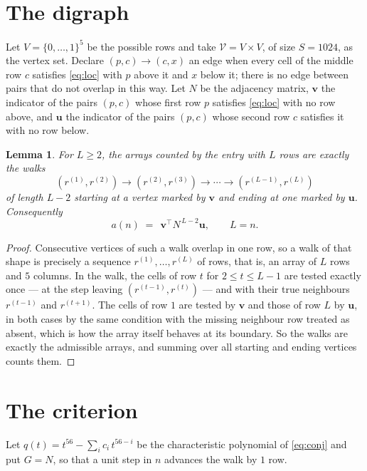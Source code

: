 \documentclass[11pt,a4paper]{article}
\theoremstyle{plain}
\newtheorem{lemma}[theorem]{Lemma}
\theoremstyle{definition}
\begin{document}
\section{The digraph}

Let $V=\{0,\dots,1\}^{5}$ be the possible rows and take
$\mathcal V=V\times V$, of size $S=1024$, as the vertex set. Declare $(p,c)\to(c,x)$ an edge
when every cell of the middle row $c$ satisfies \eqref{eq:loc} with $p$ above it and $x$
below it; there is no edge between pairs that do not overlap in this way. Let $N$ be the
adjacency matrix, $\mathbf{v}$ the indicator of the pairs $(p,c)$ whose first row $p$
satisfies \eqref{eq:loc} with no row above, and $\mathbf{u}$ the indicator of
the pairs $(p,c)$ whose second row $c$ satisfies it with no row below.

\begin{lemma}\label{lem:walk}
For $L\ge2$, the arrays counted by the entry with $L$ rows are exactly the walks
\[
(r^{(1)},r^{(2)})\to(r^{(2)},r^{(3)})\to\cdots\to(r^{(L-1)},r^{(L)})
\]
of length $L-2$ starting at a vertex marked by $\mathbf{v}$ and ending at one marked by
$\mathbf{u}$. Consequently
\[
a(n)\;=\;\,\mathbf{v}^{\!\top}N^{\,L-2}\mathbf{u},\qquad L=n .
\]
\end{lemma}

\begin{proof}
Consecutive vertices of such a walk overlap in one row, so a walk of that shape is
precisely a sequence $r^{(1)},\dots,r^{(L)}$ of rows, that is, an array of $L$ rows
and $5$ columns. In the walk, the cells of row $t$ for $2\le t\le L-1$ are tested
exactly once --- at the step leaving $(r^{(t-1)},r^{(t)})$ --- and with their true
neighbours $r^{(t-1)}$ and $r^{(t+1)}$. The cells of row $1$ are tested by
$\mathbf{v}$ and those of row $L$ by $\mathbf{u}$, in both cases by the same condition
with the missing neighbour row treated as absent, which is how the array itself behaves at
its boundary. So the walks are exactly the admissible arrays, and summing over all starting
and ending vertices counts them.
\end{proof}

\section{The criterion}

Let $q(t)=t^{56}-\sum_i c_i\,t^{56-i}$ be the characteristic polynomial of
\eqref{eq:conj} and put $G=N$, so that a unit step in $n$ advances the walk by
$1$ row.
\end{document}
